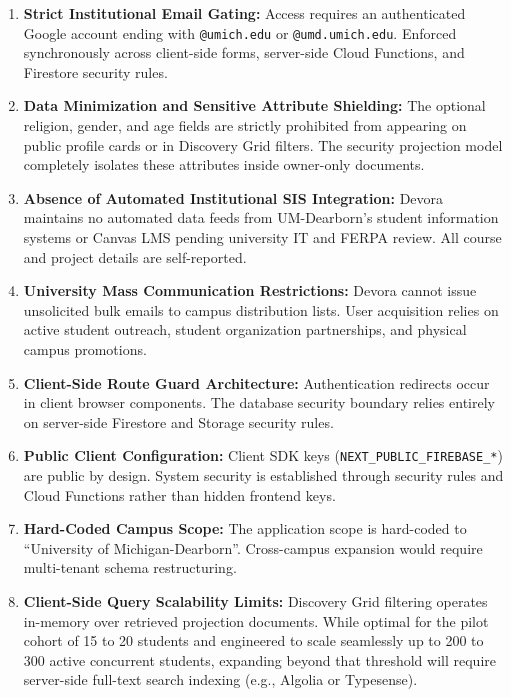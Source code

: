 \documentclass[11pt,letterpaper]{article}
\begin{document}
\begin{enumerate}[leftmargin=*,itemsep=4pt]
\item \textbf{Strict Institutional Email Gating:} Access requires an authenticated Google account ending with \texttt{@umich.edu} or \texttt{@umd.umich.edu}. Enforced synchronously across client-side forms, server-side Cloud Functions, and Firestore security rules.
\item \textbf{Data Minimization and Sensitive Attribute Shielding:} The optional religion, gender, and age fields are strictly prohibited from appearing on public profile cards or in Discovery Grid filters. The security projection model completely isolates these attributes inside owner-only documents.
\item \textbf{Absence of Automated Institutional SIS Integration:} Devora maintains no automated data feeds from UM-Dearborn's student information systems or Canvas LMS pending university IT and FERPA review. All course and project details are self-reported.
\item \textbf{University Mass Communication Restrictions:} Devora cannot issue unsolicited bulk emails to campus distribution lists. User acquisition relies on active student outreach, student organization partnerships, and physical campus promotions.
\item \textbf{Client-Side Route Guard Architecture:} Authentication redirects occur in client browser components. The database security boundary relies entirely on server-side Firestore and Storage security rules.
\item \textbf{Public Client Configuration:} Client SDK keys (\texttt{NEXT\_PUBLIC\_}\allowbreak\texttt{FIREBASE\_*}) are public by design. System security is established through security rules and Cloud Functions rather than hidden frontend keys.
\item \textbf{Hard-Coded Campus Scope:} The application scope is hard-coded to ``University of Michigan-Dearborn''. Cross-campus expansion would require multi-tenant schema restructuring.
\item \textbf{Client-Side Query Scalability Limits:} Discovery Grid filtering operates in-memory over retrieved projection documents. While optimal for the pilot cohort of 15 to 20 students and engineered to scale seamlessly up to 200 to 300 active concurrent students, expanding beyond that threshold will require server-side full-text search indexing (e.g., Algolia or Typesense).
\end{enumerate}
\end{document}
